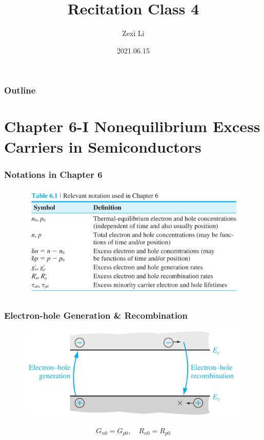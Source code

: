 \documentclass{beamer}
\begin{document}
\renewcommand{\d}{\: \mathrm{d} }
\newcommand{\e}{\mathrm{e}}


\title[] {Recitation Class 4}

\author[lzx]{Zexi Li}


\date{2021.06.15}

\frame{\titlepage}


\begin{frame}
    \frametitle{Outline}
    \tableofcontents
\end{frame}

\section{Chapter 6-I Nonequilibrium Excess Carriers in Semiconductors}
    \begin{frame} \frametitle{Notations in Chapter 6}
        \begin{figure}[H]
            \centering
            \includegraphics[width=0.9\linewidth]{Notations.jpg}
            \label{fig:Notations.jpg}
        \end{figure}
    \end{frame}
    \begin{frame} \frametitle{Electron-hole Generation \& Recombination}
        \begin{figure}[H]
            \centering
            \includegraphics[width=0.6\linewidth]{Generation-recombination.jpg}
            \label{fig:Generation-recombination.jpg}
        \end{figure}
        \begin{equation*}
            G_{n0} = G_{p0}, \quad R_{n0} = R_{p0}
        \end{equation*}
    \end{frame}
\end{document}
